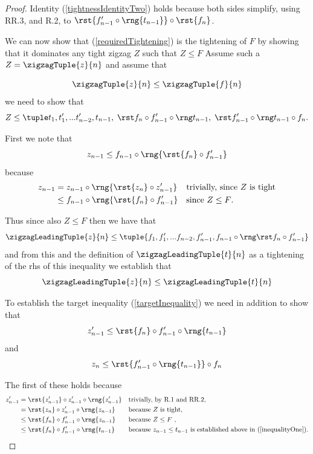 {\begin{proof}
Identity (\ref{tightnessIdentityTwo}) holds because both sides  simplify, using RR.3, and R.2, to $\rst{f'_{n-1} \circ \rng{t_{n-1}}} \circ \rst{f_n}$.

We can now show that (\ref{requiredTightening})
is the tightening of $F$ by showing that 
it dominates any tight zigzag $Z$ such that
$Z \leq F$ 
Assume such a $Z=\zigzagTuple{z}{n}$ and assume that

\[
\zigzagTuple{z}{n} \leq \zigzagTuple{f}{n}
\]
we need to show that 
\begin{equation}
\label{targetInequality}
Z \leq \requiredTightening.
\end{equation} 

First we note that  
\[
 z_{n-1} \leq f_{n-1} \circ 
       \rng{
                \rst{f_n} \circ f'_{n-1}
                     }
\]
because 
\begin{align*}
z_{n-1} &= z_{n-1} \circ \rng{\rst{z_n} \circ z'_{n-1}} && \mbox{trivially, since $Z$ is tight}\\
&\leq  f_{n-1} \circ 
       \rng{
                \rst{f_n} \circ f'_{n-1}
                     } &&\mbox{\parbox{3cm}{since $Z \leq F$.}}
\end{align*}

Thus since also $Z \leq F$ then we have that
\[
\zigzagLeadingTuple{z}{n} \leq \tuple{\tightlead}
\] 
and from this and the definition of $\zigzagLeadingTuple{t}{n}$
as a tightening of the rhs of this inequality we establish that
\[
\label{inequalityOne}
\zigzagLeadingTuple{z}{n} \leq \zigzagLeadingTuple{t}{n}
\]
 
To establish the target inequality (\ref{targetInequality})
we need 
in addition to show that
 \begin{equation}
 \label{inequalityTwo}
 z'_{n-1} \leq \rst{f_n} \circ f'_{n-1} \circ \rng{t_{n-1}}
 \end{equation}
 and
  \begin{equation}
 \label{inequalityThree}
 z_n \leq \rst{f'_{n-1} \circ \rng{t_{n-1}}} \circ f_n
 \end{equation}

The first of these holds because
\begin{align*}
z'_{n-1} &= \rst{z'_{n-1}} \circ z'_{n-1}  \circ \rng{z'_{n-1}} 
                && \mbox{trivially, by R.1 and RR.2,}\\
         &= \rst{z_n} \circ z'_{n-1}  \circ \rng{z_{n-1}} 
         &&\mbox{because $Z$ is tight,}\\
         &\leq \rst{f_n} \circ f'_{n-1}  \circ \rng{z_{n-1}}
         &&\mbox{because $Z \leq F$ ,}\\
         &\leq \rst{f_n} \circ f'_{n-1}  \circ \rng{t_{n-1}}
         &&\mbox{because $z_{n-1} \leq t_{n-1}$ is established
                               above in (\ref{inequalityOne}).}
\end{align*}


\end{proof}}
